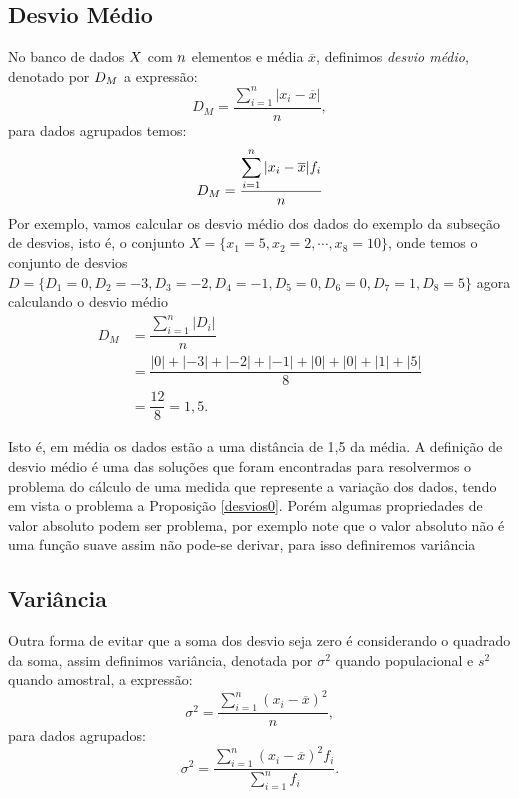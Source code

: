 \subsection{Desvio Médio}
No banco de dados $\mathnormal{X}$ com $\mathnormal{n}$ elementos e média $\overline{x}$, definimos \textit{desvio médio}, denotado por $\mathnormal{D_M}$ a expressão:
\begin{equation}
	D_M = \frac{\displaystyle \sum_{i=1}^{n}|x_i-\overline{x}|}{n},
	\end{equation}
para dados agrupados temos:
\begin{equation}
	D_M = \frac{\displaystyle \displaystyle \sum_{i=1}^{n} |x_i-\overline{x}|f_i}{n}
\end{equation}
Por exemplo, vamos calcular os desvio médio dos dados do exemplo da subseção de desvios, isto é, o conjunto $X = \{x_1 = 5,x_2 = 2,\cdots, x_8 = 10\}$, onde temos o conjunto de desvios $D = \{D_1 = 0, D_2 = -3, D_3 = -2, D_4 = -1, D_5 = 0, D_6 = 0, D_7 = 1, D_8 = 5\}$ agora calculando o desvio médio
\begin{align*}
    D_M &= \dfrac{\displaystyle \sum_{i=1}^{n} |D_i|}{n}\\
    &= \dfrac{|0| + |-3| + |-2| + |-1| + |0| + |0| + |1|+ |5|}{8}\\
    &= \dfrac{12}{8} = 1,5.
\end{align*}

\inic Isto é, em média os dados estão a uma distância de 1,5 da média. A definição de desvio médio é uma das soluções que foram encontradas para resolvermos o problema do cálculo de uma medida que represente a variação dos dados, tendo em vista o problema a Proposição \ref{desvios0}. Porém algumas propriedades de valor absoluto podem ser problema, por exemplo note que o valor absoluto não é uma função suave assim não pode-se derivar, para isso definiremos variância

\subsection{Variância}
\inic Outra forma de evitar que a soma dos desvio seja zero é considerando o quadrado da soma, assim definimos variância, denotada por $\sigma^2$ quando populacional e $s^2$ quando amostral, a expressão:
	\begin{equation}
	\label{var}
		\sigma^2 = \frac{\displaystyle \sum_{i=1}^{n} (x_i-\overline{x})^2}{n},
	\end{equation}
	para dados agrupados:
	\begin{equation}
	\label{varf}
		\sigma^2 = \frac{\displaystyle \sum_{i=1}^{n} (x_i-\overline{x})^2f_i}{\displaystyle\sum_{i=1}^{n} f_i}.
	\end{equation}

